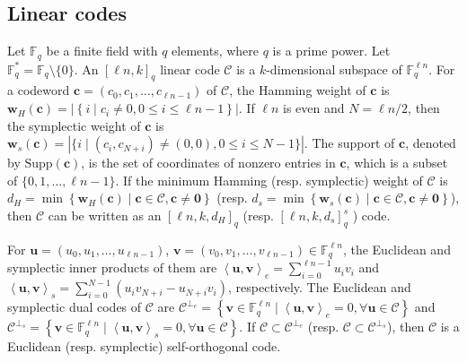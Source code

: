 \documentclass[journal]{IEEEtran}
\begin{document}
\subsection{Linear codes}

Let $\mathbb{F}_q$ be a finite field with $q$ elements, where $q$ is a prime power. Let $\mathbb{F}_q^*=\mathbb{F}_q\setminus \{0\}$. %
An $\left[\ell n,k\right]_q$ linear code $\mathscr{C}$ is a $k$-dimensional subspace of  $\mathbb{F}_{q}^{\ell n}$. 
For a codeword $\mathbf{c}=(c_{0},c_1,\ldots, c_{\ell n-1})$ of $\mathscr{C}$, the Hamming weight of $\mathbf{c}$ is $\mathbf{w}_{H}(\mathbf{c})=|\left\{i \mid c_{i} \neq 0, 0 \leq i \leq \ell n -1 \right\}|$.
If $\ell n$ is even and $N=\ell n/2$,
then the symplectic weight of $\mathbf{c}$ is 
$\mathbf{w}_{s}(\mathbf{c})=|\{i \mid (c_{i}, c_{N+i})  \neq(0,0), 0 \leq i \leq N-1 \}|$. 
The support of $\mathbf{c}$, denoted by $\mathrm{Supp}(\mathbf{c})$, is the set of coordinates of nonzero entries in $\mathbf{c}$, which is a subset of $\{0,1,\ldots,\ell n-1\}$.
If the minimum Hamming (resp. symplectic) weight of $\mathscr{C}$ is $d_{H}=\min \left\{\mathbf{w}_{H}(\mathbf{c}) \mid \mathbf{c} \in \mathscr{C}, \mathbf{c} \ne \mathbf{0} \right\}$ (resp. $d_{s}=\min \left\{\mathbf{w}_{s}(\mathbf{c}) \mid \mathbf{c} \in \mathscr{C}, \mathbf{c} \ne \mathbf{0}\right\}$), then $\mathscr{C}$ can be written as an $\left[\ell n,k,d_H\right]_q$ (resp. $\left[\ell n,k,d_s\right]_q^s$ ) code.


For $\mathbf{u }=(u_{0},u_1,  \ldots, u_{\ell n-1})$, 
$\mathbf{v}=(v_{0},v_1,\ldots, v_{\ell n-1}) \in \mathbb{F}_q^{\ell n}$,  the Euclidean and symplectic inner products of them are  $\left\langle\mathbf{u}, \mathbf{v} \right\rangle_{e}=\sum\limits_{i=0}^{\ell n-1} u_{i} v_{i}$ and 
$\left\langle\mathbf{u},\mathbf{v} \right\rangle_{s}=\sum\limits_{i=0}^{N-1}\left(u_{i} v_{N+i}-u_{N+i} v_{i}\right)$, respectively. 
The Euclidean and symplectic dual codes of $\mathscr{C}$ are  $\mathscr{C}^{\perp_{e}}=\left\{\mathbf{v} \in \mathbb{F}_{q}^{\ell n} \mid\left\langle\mathbf{u}, \mathbf{v} \right\rangle_{e}=0, \forall \mathbf{u} \in \mathscr{C}\right\}$ and
$ \mathscr{C}^{\perp_{s}}= \left\{\mathbf{v} \in \mathbb{F}_{q}^{\ell n} \mid\left\langle\mathbf{u},\mathbf{v} \right\rangle_{s}=0, \forall \mathbf{u} \in \mathscr{C}\right\}.$
If $\mathscr{C} \subset \mathscr{C}^{\perp_{e}}$ (resp. $\mathscr{C} \subset \mathscr{C}^{\perp_{s}}$), then $\mathscr{C}$ is a Euclidean (resp. symplectic) self-orthogonal code. 
\end{document}
